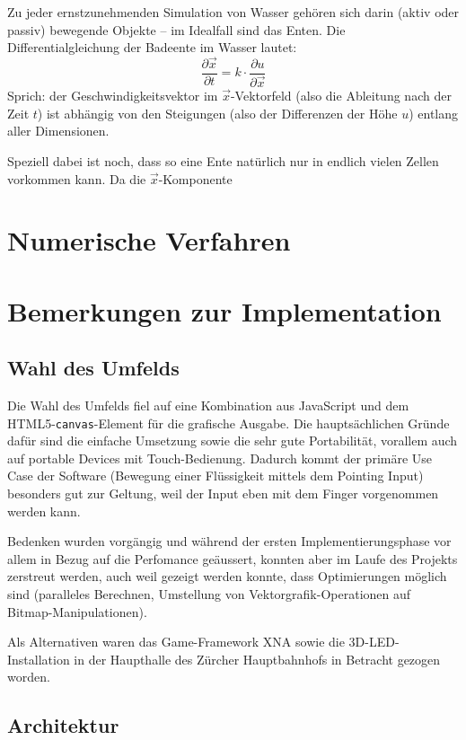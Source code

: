 \documentclass[11pt]{article} %
\theoremstyle{definition}
\begin{document}
Zu jeder ernstzunehmenden Simulation von Wasser gehören sich darin (aktiv oder passiv) bewegende Objekte -- im Idealfall sind das Enten. Die Differentialgleichung der Badeente im Wasser lautet:
\[
\frac{\partial \vec{x}}{\partial t} = k\cdot \frac{\partial u}{\partial \vec{x}}
\]
Sprich: der Geschwindigkeitsvektor im $\vec{x}$-Vektorfeld (also die Ableitung nach der Zeit $t$) ist abhängig von den Steigungen (also der Differenzen der Höhe $u$) entlang aller Dimensionen.

Speziell dabei ist noch, dass so eine Ente natürlich nur in endlich vielen Zellen vorkommen kann. Da die $\vec{x}$-Komponente 

\section{Numerische Verfahren}

\section{Bemerkungen zur Implementation}

\subsection{Wahl des Umfelds}

Die Wahl des Umfelds fiel auf eine Kombination aus JavaScript und dem HTML5-{\tt canvas}-Element für die grafische Ausgabe. Die hauptsächlichen Gründe dafür sind die einfache Umsetzung sowie die sehr gute Portabilität, vorallem auch auf portable Devices mit Touch-Bedienung. Dadurch kommt der primäre Use Case der Software (Bewegung einer Flüssigkeit mittels dem Pointing Input) besonders gut zur Geltung, weil der Input eben mit dem Finger vorgenommen werden kann.

Bedenken wurden vorgängig und während der ersten Implementierungsphase vor allem in Bezug auf die Perfomance geäussert, konnten aber im Laufe des Projekts zerstreut werden, auch weil gezeigt werden konnte, dass Optimierungen möglich sind (paralleles Berechnen, Umstellung von Vektorgrafik-Operationen auf Bitmap-Manipulationen).

Als Alternativen waren das Game-Framework XNA sowie die 3D-LED-Installation in der Haupthalle des Zürcher Hauptbahnhofs in Betracht gezogen worden.

\subsection{Architektur}
\end{document}
